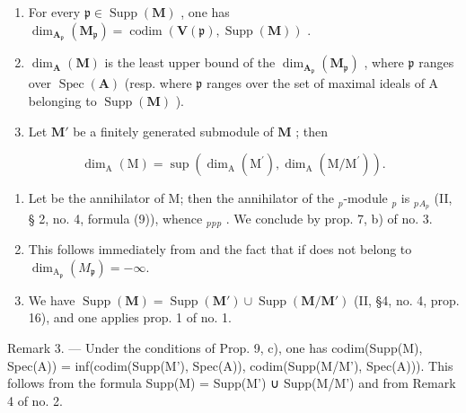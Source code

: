 \begin{enumerate}
\def\labelenumi{\alph{enumi})}
\item
  For every \(\mathfrak{p} \in \operatorname{Supp}(\mathbf{M})\) , one has \(\dim_{\mathbf{A}_{\mathfrak{p}}}(\mathbf{M}_{\mathfrak{p}}) = \operatorname{codim}(\mathbf{V}(\mathfrak{p}), \operatorname{Supp}(\mathbf{M}))\) .
\item
  \(\dim_{\mathbf{A}}(\mathbf{M})\) is the least upper bound of the \(\dim_{\mathbf{A}_{\mathfrak{p}}}(\mathbf{M}_{\mathfrak{p}})\) , where \(\mathfrak{p}\) ranges over \(\operatorname{Spec}(\mathbf{A})\) (resp. where \(\mathfrak{p}\) ranges over the set of maximal ideals of A belonging to \(\operatorname{Supp}(\mathbf{M})\) ).
\item
  Let \(\mathbf{M}'\) be a finitely generated submodule of \(\mathbf{M}\) ; then
\end{enumerate}

\[
\dim_ {\mathrm{A}} (\mathrm{M}) = \sup \left(\dim_ {\mathrm{A}} \left(\mathrm{M} ^ {\prime}\right), \dim_ {\mathrm{A}} \left(\mathrm{M} / \mathrm{M} ^ {\prime}\right)\right).
\]

\begin{enumerate}
\def\labelenumi{\alph{enumi})}
\item
  Let  be the annihilator of M; then the annihilator of the \(_{p}\)-module \(_{p}\) is \(_{p}\)\(_{A_{p}}\) (II, § 2, no. 4, formula (9)), whence \(_{p}\)\(_{p}\)\(_{p}\) . We conclude by prop. 7, b) of no. 3.
\item
  This follows immediately from  and the fact that  if  does not belong to \(\dim_{\mathrm{A}_{\mathfrak{p}}}(M_{\mathfrak{p}}) = -\infty\).
\item
  We have \(\operatorname{Supp}(\mathbf{M}) = \operatorname{Supp}(\mathbf{M}') \cup \operatorname{Supp}(\mathbf{M} / \mathbf{M}')\) (II, §4, no. 4, prop. 16), and one applies prop. 1 of no. 1.
\end{enumerate}

Remark 3. --- Under the conditions of Prop. 9, c), one has codim(Supp(M), Spec(A)) = inf(codim(Supp(M'), Spec(A)), codim(Supp(M/M'), Spec(A))). This follows from the formula Supp(M) = Supp(M') ∪ Supp(M/M') and from Remark 4 of no. 2.


